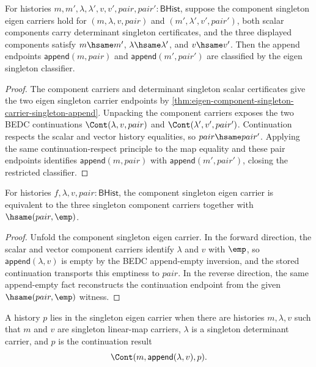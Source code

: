 \begin{theorem}
\label{thm:eigen-component-singleton-carrier-append-classifier}
For histories $m,m',\lambda,\lambda',v,v',pair,pair':\mathsf{BHist}$, suppose
the component singleton eigen carriers hold for $(m,\lambda,v,pair)$ and
$(m',\lambda',v',pair')$, both scalar components carry determinant singleton
certificates, and the three displayed components satisfy
$m\hsame m'$, $\lambda\hsame\lambda'$, and $v\hsame v'$. Then the append
endpoints $\mathsf{append}(m,pair)$ and $\mathsf{append}(m',pair')$ are
classified by the eigen singleton classifier.
\end{theorem}
\begin{proof}
The component carriers and determinant singleton scalar certificates give the
two eigen singleton carrier endpoints by
\autoref{thm:eigen-component-singleton-carrier-singleton-append}. Unpacking the
component carriers exposes the two BEDC continuations
$\Cont(\lambda,v,pair)$ and $\Cont(\lambda',v',pair')$. Continuation respects
the scalar and vector history equalities, so $pair\hsame pair'$. Applying the
same continuation-respect principle to the map equality and these pair
endpoints identifies $\mathsf{append}(m,pair)$ with
$\mathsf{append}(m',pair')$, closing the restricted classifier.
\end{proof}

\begin{theorem}
\label{thm:eigen-singleton-carrier-pair-empty}
For histories $f,\lambda,v,pair:\mathsf{BHist}$, the component singleton
eigen carrier is equivalent to the three singleton component carriers
together with $\hsame(pair,\emp)$.
\end{theorem}
\begin{proof}
Unfold the component singleton eigen carrier. In the forward direction, the
scalar and vector component carriers identify $\lambda$ and $v$ with $\emp$,
so $\mathsf{append}(\lambda,v)$ is empty by the BEDC append-empty inversion,
and the stored continuation transports this emptiness to $pair$. In the
reverse direction, the same append-empty fact reconstructs the continuation
endpoint from the given $\hsame(pair,\emp)$ witness.
\end{proof}

\begin{definition}
\label{def:eigen-singleton-carrier}
A history $p$ lies in the singleton eigen carrier when there are histories
$m,\lambda,v$ such that $m$ and $v$ are singleton linear-map carriers,
$\lambda$ is a singleton determinant carrier, and $p$ is the continuation
result
$$
\Cont(m,\mathsf{append}(\lambda,v),p).
$$
\end{definition}

